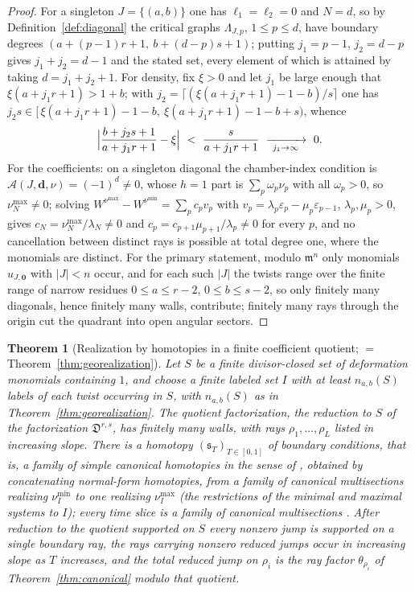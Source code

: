 \documentclass[11pt]{amsart}
\newtheorem{theorem}{Theorem}[section]
\theoremstyle{definition}
\theoremstyle{remark}
\newcommand{\Dscr}{\mathfrak{D}}
\newcommand{\Ascr}{\mathcal{A}}
\begin{document}
\begin{proof}
For a singleton $J=\{(a,b)\}$ one has $\ell_{1}=\ell_{2}=0$ and $N=d$, so by
Definition~\ref{def:diagonal} the critical graphs $\Lambda_{J,p}$, $1\le p\le d$,
have boundary degrees $(a+(p-1)r+1,\ b+(d-p)s+1)$; putting $j_1=p-1$,
$j_2=d-p$ gives $j_1+j_2=d-1$ and the stated set, every element of which is
attained by taking $d=j_1+j_2+1$. For density, fix $\xi>0$ and let $j_1$
be large enough that $\xi(a+j_1r+1)>1+b$; with
$j_2=\lceil (\xi(a+j_1r+1)-1-b)/s\rceil$ one has
$j_2 s\in[\,\xi(a+j_1r+1)-1-b,\ \xi(a+j_1r+1)-1-b+s)$, whence
\[
\Bigl|\frac{b+j_2 s+1}{a+j_1r+1}-\xi\Bigr|\ <\ \frac{s}{a+j_1r+1}\
\xrightarrow[\ j_1\to\infty\ ]{}\ 0 .
\]
For the coefficients: on a singleton diagonal the chamber-index
condition is $\Ascr(J,\mathbf d,\nu)=(-1)^{d}\ne0$, whose $h=1$ part is
$\sum_{p}\omega_{p}\nu_{p}$ with all $\omega_{p}>0$, so $\nu^{\max}_{N}\ne0$;
solving $W^{\nu^{\max}}-W^{\nu^{\min}}=\sum_{p}c_{p}v_{p}$ with
$v_{p}=\lambda_{p}\varepsilon_{p}-\mu_{p}\varepsilon_{p-1}$, $\lambda_{p},\mu_{p}>0$, gives
$c_{N}=\nu^{\max}_{N}/\lambda_{N}\ne0$ and $c_{p}=c_{p+1}\mu_{p+1}/\lambda_{p}\ne0$ for every
$p$, and no cancellation between distinct rays is possible at total degree one,
where the monomials are distinct.
For the primary statement, modulo $\mathfrak m^{n}$ only monomials
$u_{J,\mathbf 0}$ with $|J|<n$ occur, and for each such $|J|$ the twists range
over the finite range of narrow residues $0\le a\le r-2$, $0\le b\le s-2$, so
only finitely many diagonals, hence
finitely many walls, contribute; finitely many rays through the origin cut the
quadrant into open angular sectors.
\end{proof}

\begin{theorem}[Realization by homotopies in a finite coefficient quotient;
  $=$ Theorem~\ref{thm:georealization}]
\label{conj:geometric}
Let $S$ be a finite divisor-closed set of deformation monomials containing
$1$, and choose a finite labeled set $I$ with at least $n_{a,b}(S)$ labels of
each twist occurring in $S$, with $n_{a,b}(S)$ as in
Theorem~\ref{thm:georealization}.  The quotient factorization, the reduction to
$S$ of the factorization $\Dscr^{r,s}$, has finitely many walls, with rays
$\rho_1,\dots,\rho_L$ listed in increasing slope.  There is a homotopy
$(\mathfrak s_{T})_{T\in[0,1]}$ of boundary conditions, that is, a family of
simple canonical homotopies in the sense of \cite[Defs.~3.36--3.37]{GKT},
obtained by concatenating normal-form homotopies, from a family of canonical multisections realizing $\nu_I^{\min}$ to
one realizing $\nu_I^{\max}$ (the restrictions of the minimal and maximal
systems to $I$); every time slice is a family of canonical multisections
\cite[Def.~3.22]{GKT}.  After reduction to the quotient supported on $S$ every
nonzero jump is supported on a single boundary ray, the rays carrying nonzero
reduced jumps occur in increasing slope as $T$ increases, and the total
reduced jump on $\rho_{i}$
is the ray factor $\theta_{\rho_{i}}$ of
Theorem~\ref{thm:canonical} modulo that quotient.
\end{theorem}
\end{document}
